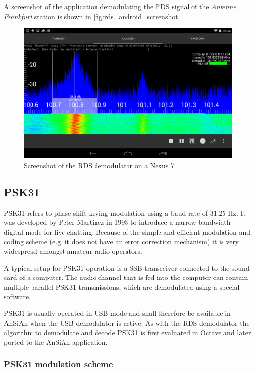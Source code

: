 A screenshot of the application demodulating the \ac{RDS} signal of the
\emph{Antenne Frankfurt} station is shown in \autoref{fig:rds_android_screenshot}.

\begin{figure}
	\centering
	\includegraphics[width=1\linewidth]{gfx/rds/android_screenshot.png}
	\caption{Screenshot of the RDS demodulator on a Nexus 7}
	\label{fig:rds_android_screenshot}
\end{figure}


\subsection{PSK31\label{sec:psk31}}

\ac{PSK31} refers to phase shift keying modulation using a baud rate of 31.25
Hz.  It was developed by Peter Martinez in 1998 to introduce a narrow bandwidth
digital mode for live chatting. Because of the simple and efficient modulation
and coding scheme (e.g. it does not have an error correction mechanism) it is
very widespread amongst amateur radio operators.

A typical setup for \ac{PSK31} operation is a \ac{SSB} transceiver connected
to the sound card of a computer. The audio channel that is fed into the computer
can contain multiple parallel \ac{PSK31} transmissions, which are demodulated
using a special software.

PSK31 is usually operated in \ac{USB} mode and shall therefore be available
in \ac{AnSiAn} when the \ac{USB} demodulator is active.
As with the \ac{RDS} demodulator the algorithm to demodulate and decode \ac{PSK31}
is first evaluated in Octave and later ported to the \ac{AnSiAn} application.

\subsubsection{PSK31 modulation scheme}

